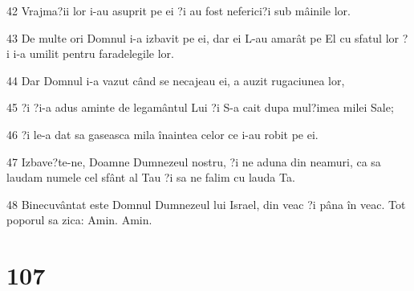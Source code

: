 \par 42 Vrajma?ii lor i-au asuprit pe ei ?i au fost neferici?i sub mâinile lor.
\par 43 De multe ori Domnul i-a izbavit pe ei, dar ei L-au amarât pe El cu sfatul lor ?i i-a umilit pentru faradelegile lor.
\par 44 Dar Domnul i-a vazut când se necajeau ei, a auzit rugaciunea lor,
\par 45 ?i ?i-a adus aminte de legamântul Lui ?i S-a cait dupa mul?imea milei Sale;
\par 46 ?i le-a dat sa gaseasca mila înaintea celor ce i-au robit pe ei.
\par 47 Izbave?te-ne, Doamne Dumnezeul nostru, ?i ne aduna din neamuri, ca sa laudam numele cel sfânt al Tau ?i sa ne falim cu lauda Ta.
\par 48 Binecuvântat este Domnul Dumnezeul lui Israel, din veac ?i pâna în veac. Tot poporul sa zica: Amin. Amin.

\chapter{107}

